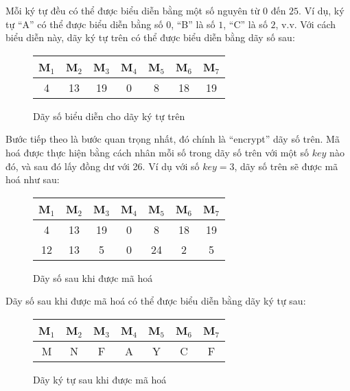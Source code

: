 \documentclass[a4paper,12pt]{article}
\begin{document}
Mỗi ký tự đều có thể được biểu diễn bằng một số nguyên từ $0$ đến $25$.
Ví dụ, ký tự ``A'' có thể được biểu diễn bằng số $0$, ``B'' là số $1$, ``C'' là số $2$, v.v.
Với cách biểu diễn này, dãy ký tự trên có thể được biểu diễn bằng dãy số sau:

\begin{figure}[H]
    \centering
    \begin{tabular}{c c c c c c c}
        \toprule
        M$_1$ & M$_2$ & M$_3$ & M$_4$ & M$_5$ & M$_6$ & M$_7$ \\
        \midrule
        4     & 13    & 19    & 0     & 8     & 18    & 19    \\
        \bottomrule
    \end{tabular}
    \caption{Dãy số biểu diễn cho dãy ký tự trên}
\end{figure}

Bước tiếp theo là bước quan trọng nhất, đó chính là ``encrypt'' dãy số trên.
Mã hoá được thực hiện bằng cách nhân mỗi số trong dãy số trên với một số $key$ nào đó,
và sau đó lấy đồng dư với 26. Ví dụ với số $key=3$, dãy số trên sẽ được mã hoá như sau:

\begin{figure}[H]
    \centering
    \begin{tabular}{c c c c c c c}
        \toprule
        M$_1$ & M$_2$ & M$_3$ & M$_4$ & M$_5$ & M$_6$ & M$_7$ \\
        \midrule
        4     & 13    & 19    & 0     & 8     & 18    & 19    \\
        12    & 13    & 5     & 0     & 24    & 2     & 5     \\
        \bottomrule
    \end{tabular}
    \caption{Dãy số sau khi được mã hoá}
\end{figure}

Dãy số sau khi được mã hoá có thể được biểu diễn bằng dãy ký tự sau:

\begin{figure}[H]
    \centering
    \begin{tabular}{c c c c c c c}
        \toprule
        M$_1$ & M$_2$ & M$_3$ & M$_4$ & M$_5$ & M$_6$ & M$_7$ \\
        \midrule
        M     & N     & F     & A     & Y     & C     & F     \\
        \bottomrule
    \end{tabular}
    \caption{Dãy ký tự sau khi được mã hoá}
\end{figure}
\end{document}
